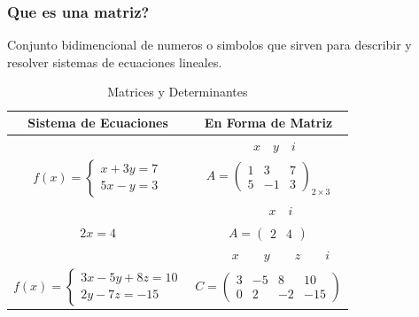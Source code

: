 \documentclass[stu, 12pt, a4paper, donotrepeattitle, floatsintext, natbib]{apa7}
\begin{document}
    \subsubsection{Que es una matriz?}
    Conjunto bidimencional de numeros o simbolos que sirven para describir y resolver sistemas de ecuaciones lineales.
    \begin{table}
        \centering
        \begin{tabular}{|c|c|}
            \hline
            Sistema de Ecuaciones & En Forma de Matriz \\ \hline
            & $\quad x\quad y\quad i$ \\
            $ f(x) =  \begin{cases}
                          x + 3y = 7 \\ 5x - y = 3
            \end{cases} $
            &
            $A = \begin{pmatrix}
                     1 & 3  & 7 \\
                     5 & -1 & 3
            \end{pmatrix}_{2\times3}$ \\[1cm]\hline

            & $\quad\quad\quad x\quad i\quad $ \\
            $2x=4$ & $A = \begin{pmatrix}
                              2 & 4
            \end{pmatrix}$ \\[0.8cm]\hline

            & $\quad\quad x\quad\quad y\quad\quad z\quad\quad i$ \\
            $ f(x)=\begin{cases}
                       3x-5y+8z=10 \\ 2y-7z=-15
            \end{cases} $ &
            $C=\begin{pmatrix}
                   3 & -5 & 8  & 10  \\
                   0 & 2  & -2 & -15
            \end{pmatrix}$ \\[1cm]\hline
        \end{tabular}\label{tab:table}
        \caption{Matrices y Determinantes}
    \end{table}
\end{document}
